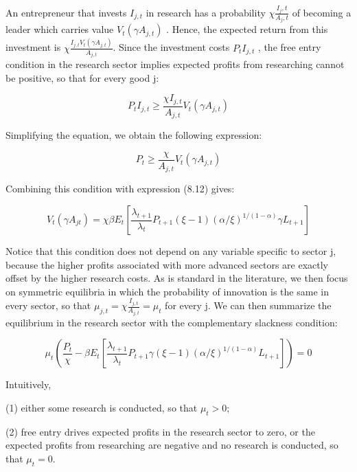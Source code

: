 \documentclass[cn,10pt,math=newtx,citestyle=gb7714-2015,bibstyle=gb7714-2015]{elegantbook}
\begin{document}
{{An entrepreneur that invests $I_{j,t}$ in research has a probability $\chi\frac{I_j,t}{A_j,t}$ of becoming a leader which carries value $V_t (\gamma A_{j,t} )$ . Hence, the expected return from this investment is $\chi \frac{I_{j,t}V_t (\gamma A_{j,t} )}{A_{j,t}} $. Since the investment costs $P_t I_{j,t}$ , the free entry condition in the research sector implies expected profits from researching cannot be positive, so that for every good j:

\begin{equation}
	P_{t} I_{j,t} \geq \frac{\chi I_{j,t}}{A_{j,t}} V_{t}\left(\gamma A_{j,t}\right)
\end{equation}

Simplifying the equation, we obtain the following expression: 

\begin{equation}
	P_{t}  \geq \frac{\chi}{A_{j,t}} V_{t}\left(\gamma A_{j,t}\right)
	\end{equation}

Combining this condition with expression (8.12) gives:

\begin{equation}
	V_{t}\left(\gamma A_{j t}\right)= \chi \beta E_{t}\left[\frac{\lambda_{t+1}}{\lambda_{t}} P_{t+1} (\xi-1)(\alpha / \xi)^{1 /(1-\alpha)} \gamma L_{t+1}\right]
\end{equation}

Notice that this condition does not depend on any variable specific to sector j, because the higher profits associated with more advanced sectors are exactly offset by the higher research costs. As is standard in the literature, we then focus on symmetric equilibria in which the probability of innovation is the same in every sector, so that $\mu_{j,t} =\chi \frac{ I_{j,t}}{A_{j,t}} = \mu_t$ for every j. We can then summarize the equilibrium in the research sector with the complementary slackness condition:

\begin{equation}
	\mu_{t}\left(\frac{P_{t}}{\chi}-\beta E_{t}\left[\frac{\lambda_{t+1}}{\lambda_{t}} P_{t+1} \gamma (\xi-1)(\alpha / \xi)^{1 /(1-\alpha)} L_{t+1}\right]\right)=0
\end{equation}

Intuitively, 

(1) either some research is conducted, so that $\mu_t >0$;

(2) free entry drives expected profits in the research sector to zero, or the expected profits from researching are negative and no research is conducted, so that $\mu_t =0$.

}}
\end{document}
